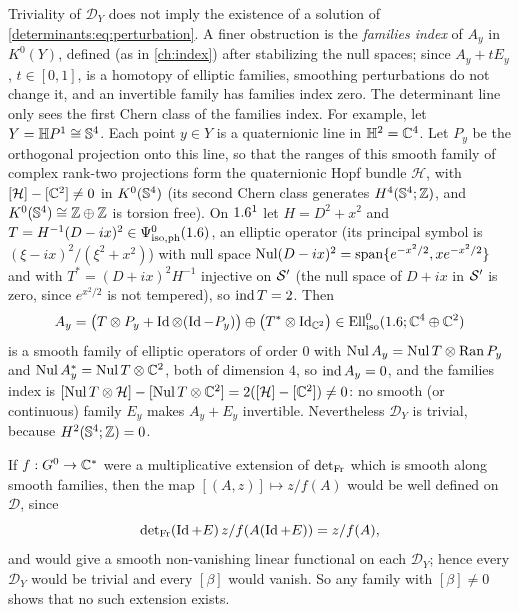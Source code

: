 \begin{remark}\label{determinants:rem:not-sufficient}
  Triviality of $\mathcal D_Y$ does not imply the existence of a solution of
  \eqref{determinants:eq:perturbation}. A finer obstruction is the
  \emph{families index} of $A_y$ in $K^0(Y)$, defined (as in
  \cref{ch:index}) after stabilizing the null spaces; since
  $A_y+tE_y$, $t\in[0,1]$, is a homotopy of elliptic families, smoothing
  perturbations do not change it, and an invertible family has families index
  zero. The determinant line only sees the first Chern class of the families
  index. For example, let $Y=\mathbb H P^1\cong\mathbb{S}^4$. Each point
  $y\in Y$ is a quaternionic line in $\mathbb H^2=\mathbb{C}^4$. Let $P_y$ be the
  orthogonal projection onto this line, so that the ranges of this smooth
  family of complex rank-two projections form the
  quaternionic Hopf bundle $\mathcal H$, with $[\mathcal H]-[\mathbb{C}^2]\ne0$ in
  $K^0(\mathbb{S}^4)$ (its second Chern class generates
  $H^4(\mathbb{S}^4;\mathbb{Z})$, and $K^0(\mathbb{S}^4)\cong\mathbb{Z}\oplus\mathbb{Z}$ is torsion
  free). On $1.6^1$ let $H=D^2+x^2$ and $T=H^{-1}(D-ix)^2\in\Psi^{0}_{\mathrm{iso,ph}}(1.6)$,
  an elliptic operator (its principal symbol is
  $(\xi-ix)^2/(\xi^2+x^2)$) with null space
  $\operatorname{Nul}(D-ix)^2=\operatorname{span}\{e^{-x^2/2},xe^{-x^2/2}\}$ and with
  $T^*=(D+ix)^2H^{-1}$ injective on $\mathcal{S}'$ (the null space of $D+ix$ in $\mathcal{S}'$
  is zero, since $e^{x^2/2}$ is not tempered), so $\operatorname{ind} T=2$. Then
  \begin{equation*}
    A_y=\bigl(T\otimes P_y+\operatorname{Id}\otimes(\operatorname{Id}-P_y)\bigr)\oplus\bigl(T^*\otimes\operatorname{Id}_{\mathbb{C}^2}\bigr)\in\operatorname{Ell}^0_{\mathrm{iso}}(1.6;\mathbb{C}^4\oplus\mathbb{C}^2)
  \end{equation*}
  is a smooth family of elliptic operators of order $0$ with
  $\operatorname{Nul} A_y=\operatorname{Nul} T\otimes\operatorname{Ran}P_y$ and
  $\operatorname{Nul} A_y^*=\operatorname{Nul} T\otimes\mathbb{C}^2$, both of dimension $4$, so $\operatorname{ind} A_y=0$, and
  the families index is $[\operatorname{Nul} T\otimes\mathcal H]-[\operatorname{Nul} T\otimes\mathbb{C}^2]
  =2([\mathcal H]-[\mathbb{C}^2])\ne0$: no smooth (or continuous) family $E_y$ makes
  $A_y+E_y$ invertible. Nevertheless $\mathcal D_Y$ is trivial, because
  $H^2(\mathbb{S}^4;\mathbb{Z})=0$.
\end{remark}

\begin{remark}\label{determinants:rem:no-extension}
  If $f:G^0\to\mathbb{C}^*$ were a multiplicative extension of $\operatorname{det}_{\mathrm{Fr}}$ which is smooth
  along smooth families, then the map $[(A,z)]\mapsto z/f(A)$ would be well
  defined on $\mathcal D$, since
  \begin{equation*}
    \operatorname{det}_{\mathrm{Fr}}(\operatorname{Id}+E)\,z/f(A(\operatorname{Id}+E))=z/f(A),
  \end{equation*}
  and would give a smooth non-vanishing
  linear functional on each $\mathcal D_Y$; hence every $\mathcal D_Y$ would be
  trivial and every $[\beta]$ would vanish. So any family with $[\beta]\ne0$
  shows that no such extension exists.
\end{remark}

